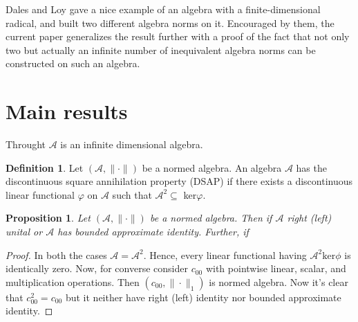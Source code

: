 \documentclass{amsart}
\newtheorem{prop}[thm]{Proposition}
\theoremstyle{definition}
\newtheorem{defn}[thm]{Definition}
\numberwithin{equation}{section}
\begin{document}
Dales and Loy \cite{DL:97} gave a nice example of an algebra with a finite-dimensional radical, and built two different algebra norms on it. Encouraged by them, the current paper generalizes the result further with a proof of the fact that not only two but actually an infinite number of inequivalent algebra norms can be constructed on such an algebra.

\section{Main results}
\noindent Throught $\mathcal{A}$ is an infinite dimensional algebra.

\begin{defn}
	Let $(\mathcal{A}, \| \cdot \|)$ be a normed algebra. An algebra $\mathcal{A}$ has the discontinuous square annihilation property (DSAP) if there exists a   discontinuous linear functional $\varphi$ on $\mathcal{A}$ such that $\mathcal{A}^2 \subseteq $ ker$\varphi$.
\end{defn}

\begin{prop}
	Let $(\mathcal{A}, \| \cdot \|)$ be a normed algebra. Then  if $\mathcal{A}$ right (left) unital or $\mathcal{A}$ has bounded approximate identity. Further, if 
\end{prop}

\begin{proof}
	In both the cases $\mathcal{A} = \mathcal{A}^2$. Hence, every linear functional having $\mathcal{A}^2 \text{ker}\phi$ is identically zero. Now, for converse consider $c_{00}$ with pointwise linear, scalar, and multiplication operations. Then $(c_{00}, \| \cdot \|_1)$ is normed algebra. Now it's clear that $c_{00}^2= c_{00}$ but it neither have right (left) identity nor bounded approximate identity.
\end{proof}
\end{document}
